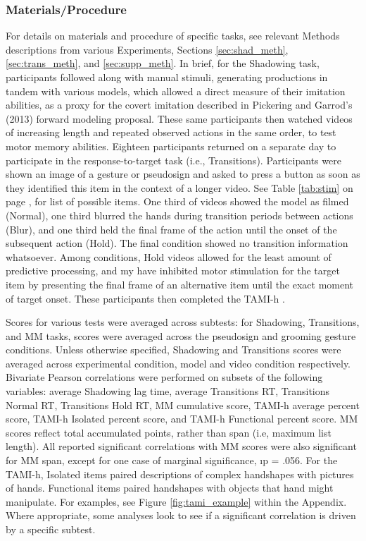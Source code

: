         \subsubsection{Materials/Procedure}
            For details on materials and procedure of specific tasks, see relevant Methods descriptions from various Experiments, Sections \ref{sec:shad_meth}, \ref{sec:trans_meth}, and \ref{sec:supp_meth}. In brief, for the Shadowing task, participants followed along with manual stimuli, generating productions in tandem with various models, which allowed a direct measure of their imitation abilities, as a proxy for the covert imitation described in Pickering and Garrod’s (2013) forward modeling proposal. These same participants then watched videos of increasing length and repeated observed actions in the same order, to test motor memory abilities. Eighteen participants returned on a separate day to participate in the response-to-target task (i.e., Transitions). Participants were shown an image of a gesture or pseudosign and asked to press a button as soon as they identified this item in the context of a longer video. See Table \ref{tab:stim} on page \pageref{tab:stim}, for list of possible items. One third of videos showed the model as filmed (Normal), one third blurred the hands during transition periods between actions (Blur), and one third held the final frame of the action until the onset of the subsequent action (Hold). The final condition showed no transition information whatsoever. Among conditions, Hold videos allowed for the least amount of predictive processing, and my have inhibited motor stimulation for the target item by presenting the final frame of an alternative item until the exact moment of target onset. These participants then completed the TAMI-h \cite{donoff2018}. \par
            Scores for various tests were averaged across subtests: for Shadowing, Transitions, and MM tasks, scores were averaged across the pseudosign and grooming gesture conditions. Unless otherwise specified, Shadowing and Transitions scores were averaged across experimental condition, model and video condition respectively. Bivariate Pearson correlations were performed on subsets of the following variables: average Shadowing lag time, average Transitions RT, Transitions Normal RT, Transitions Hold RT, MM cumulative score, TAMI-h average percent score, TAMI-h Isolated percent score, and TAMI-h Functional percent score. MM scores reflect total accumulated points, rather than span (i.e, maximum list length). All reported significant correlations with MM scores were also significant for MM span, except for one case of marginal significance, \i{p} = .056. For the TAMI-h, Isolated items paired descriptions of complex handshapes with pictures of hands. Functional items paired handshapes with objects that hand might manipulate. For examples, see Figure \ref{fig:tami_example} within the Appendix. Where appropriate, some analyses look to see if a significant correlation is driven by a specific subtest. \par
